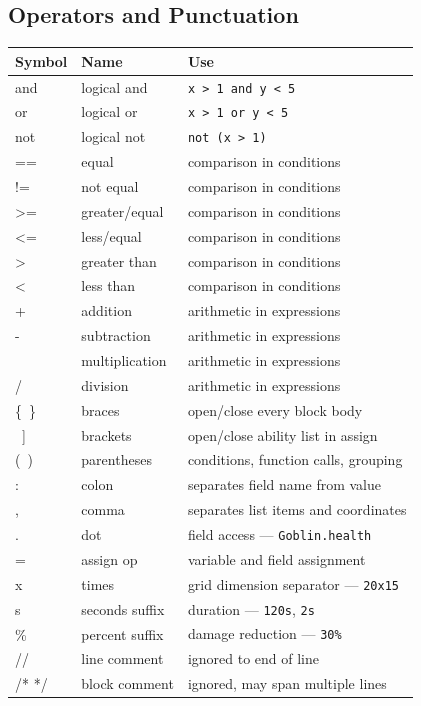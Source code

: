 \documentclass[12pt,a4paper]{article}
\begin{document}
\subsection{Operators and Punctuation}
\begin{longtable}{>{\ttfamily}p{2.2cm} p{3cm} p{8.3cm}}
\toprule
\normalfont\textbf{Symbol} & \textbf{Name} & \textbf{Use} \\
\midrule
and   & logical and    & \texttt{x > 1 and y < 5} \\
or    & logical or     & \texttt{x > 1 or y < 5} \\
not   & logical not    & \texttt{not (x > 1)} \\
==    & equal          & comparison in conditions \\
!=    & not equal      & comparison in conditions \\
>=    & greater/equal  & comparison in conditions \\
<=    & less/equal     & comparison in conditions \\
>     & greater than   & comparison in conditions \\
<     & less than      & comparison in conditions \\
+     & addition       & arithmetic in expressions \\
-     & subtraction    & arithmetic in expressions \\
*     & multiplication & arithmetic in expressions \\
/     & division       & arithmetic in expressions \\
\{\ \}  & braces       & open/close every block body \\
{[}\ {]} & brackets    & open/close ability list in assign \\
(\ )  & parentheses    & conditions, function calls, grouping \\
:     & colon          & separates field name from value \\
,     & comma          & separates list items and coordinates \\
.     & dot            & field access --- \texttt{Goblin.health} \\
=     & assign op      & variable and field assignment \\
x     & times          & grid dimension separator --- \texttt{20x15} \\
s     & seconds suffix & duration --- \texttt{120s}, \texttt{2s} \\
\%    & percent suffix & damage reduction --- \texttt{30\%} \\
//    & line comment   & ignored to end of line \\
/* */ & block comment  & ignored, may span multiple lines \\
\bottomrule
\end{longtable}
\end{document}
